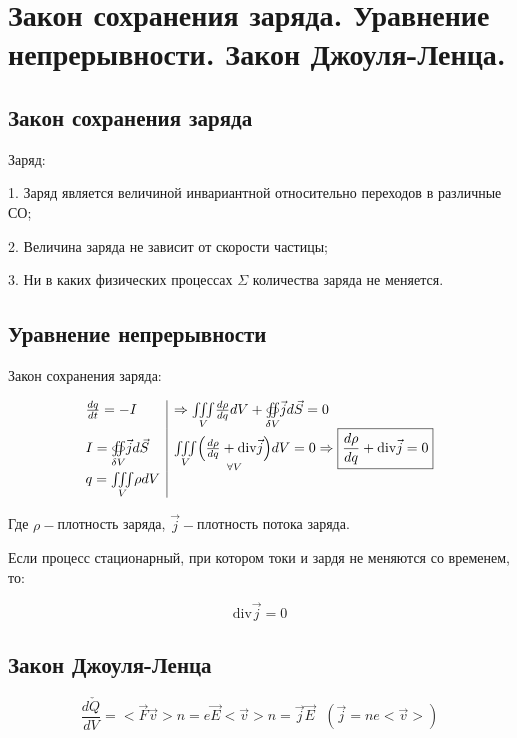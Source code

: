 


\newpage
\section{Закон сохранения заряда. Уравнение непрерывности. Закон Джоуля-Ленца.}
 
\subsection*{Закон сохранения заряда}

Заряд:

1. Заряд является величиной инвариантной относительно переходов в различные СО;

2. Величина заряда не зависит от скорости частицы;

3. Ни в каких физических процессах $\Sigma$ количества заряда не меняется. 

\subsection*{Уравнение непрерывности}

Закон сохранения заряда:

\[\begin{array}{l|l}
    \frac{dq}{dt}=-I & \Rightarrow \underset{V}{\iiint} \frac{d\rho}{dq}dV +\underset{\delta V}{\oiint} \vec{j}d\vec{S}=0  \\
    I=\underset{\delta V}{\oiint} \vec{j}d\vec{S} & \underset{V}{\iiint}\underset{\forall V }{\left( \frac{d\rho}{dq}+\mm{div} \vec{j}  \right)}dV=0 \Rightarrow \boxed{\frac{d\rho}{dq}+\mm{div} \vec{j}=0 } \\
    q=\underset{V}{\iiint}\rho dV 
\end{array}\]

Где $\rho-$плотность заряда, $\vec{j}-$плотность потока заряда.

Если процесс стационарный, при котором токи и зардя не меняются со временем, то:

\[\mathrm{div}\vec{j} =0\]

\subsection*{Закон Джоуля-Ленца}

\[\frac{d\check{Q}}{dV} =<\vec{F}\vec{v}>n=e\vec{E}<\vec{v}>n=\vec{j}\vec{E}\text{ }(\vec{j}=ne<\vec{v}>)\]


